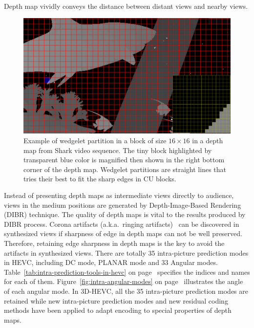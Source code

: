 Depth map vividly conveys the distance between distant views
and nearby views.
\begin{figure}[!t]
    \centering
    \includegraphics[width=\textwidth,height=\textheight,keepaspectratio]{Figures/wedgelet}
    \caption[Wedgelet partition illustration]
    {Example of wedgelet partition in a block of size 
    \(16\times16\) in a depth map
    from Shark video sequence.
    The tiny block highlighted by transparent blue color
    is magnified then shown in the right bottom corner
    of the depth map.
    Wedgelet partitions are straight lines
    that tries their best to fit the sharp edges in CU blocks.
    }\label{fig:wedgelet-partition}
\end{figure}
Instead of presenting depth maps as 
intermediate views directly to audience, views in the medium
positions are generated by Depth-Image-Based Rendering (DIBR) technique.
The quality of depth maps is vital to the results produced by
DIBR process.
Corona artifacts (a.k.a.\ ringing artifacts)~\parencite{RN44}
can be discovered in synthesized
views if sharpness of edge in depth maps can not be well
preserved.
Therefore, retaining edge sharpness in depth maps is the key to avoid the
artifacts in synthesized views.
There are totally 35 intra-picture prediction modes in HEVC, 
including DC mode, PLANAR mode and 33 Angular modes.
Table~\ref{tab:intra-prediction-tools-in-hevc} 
on page~\pageref{tab:intra-prediction-tools-in-hevc}
specifies 
the indices and names for each of them.
Figure~\ref{fig:intra-angular-modes} 
on page~\pageref{fig:intra-angular-modes} 
illustrates the angle of each 
angular mode.
In 3D-HEVC, all the 35 intra-picture prediction modes
are retained while new intra-picture prediction modes 
and new residual coding methods
have been applied to adapt encoding 
to special properties of depth maps.

